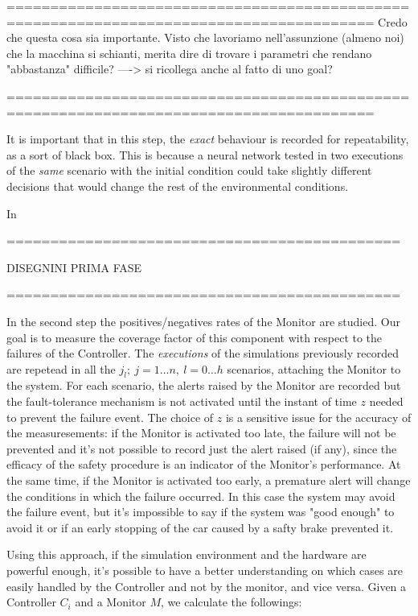========================================================================================
Credo che questa cosa sia importante. Visto che lavoriamo nell'assunzione (almeno noi) che la macchina si schianti, merita dire di trovare i parametri che rendano "abbastanza" difficile?   ----> si ricollega anche al fatto di uno goal?

========================================================================================
\newline

It is important that in this step, the \textsl{exact} behaviour is recorded for repeatability, as a sort of black box. This is because a neural network tested in two executions of the \textsl{same} scenario with the  initial condition could take slightly different decisions that would change the rest of the environmental conditions.\newline

In



=============================================

DISEGNINI PRIMA FASE

=============================================

In the second step the positives/negatives rates of the Monitor are studied. Our goal is to measure the coverage factor of this component with respect to the failures of the Controller.\newline
The \textsl{executions} of the simulations previously recorded are repetead in all the $j_{l}; \: j=1\dots n, \: l=0\dots h$ scenarios, attaching the Monitor to the system. For each scenario, the alerts raised by the Monitor are recorded but the fault-tolerance mechanism is not activated until the instant of time $z$ needed to prevent the failure event. The choice of $z$ is a sensitive issue for the accuracy of the measuresements: if the Monitor is activated too late, the failure will not be prevented and it's not possible to record just the alert raised (if any), since the efficacy of the safety procedure is an indicator of the Monitor's performance. At the same time, if the Monitor is activated too early, a premature alert will change the conditions in which the failure occurred. In this case the system may avoid the failure event, but it's impossible to say if the system was "good enough" to avoid it or if an early stopping of the car caused by a safty brake prevented it.

Using this approach, if the simulation environment and the hardware are powerful enough, it's possible to have a better understanding on which cases are easily handled by the Controller and not by the monitor, and vice versa.
Given a Controller $C_{i}$ and a Monitor $M$, we calculate the followings:

